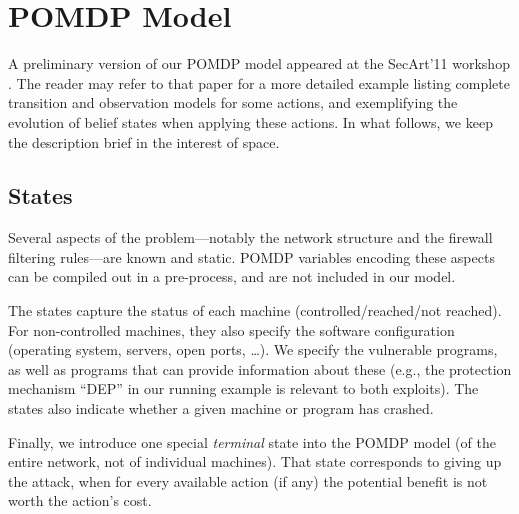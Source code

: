 \section{POMDP Model}
\label{POMDP-model}


A preliminary version of our POMDP model appeared at the SecArt'11
workshop \cite{SarBufHof11}. The reader may refer to that paper for a
more detailed example listing complete transition and observation
models for some actions, and exemplifying the evolution of belief
states when applying these actions. In what follows, we keep the
description brief in the interest of space.





\subsection{States}
\label{POMDP-model:states}


Several aspects of the problem---notably the network structure and the
firewall filtering rules---are known and static. POMDP variables
encoding these aspects can be compiled out in a pre-process, and are
not included in our model.

The states capture the status of each machine (controlled/reached/not
reached). For non-controlled machines, they also specify the software
configuration (operating system, servers, open ports, \dots). We
specify the vulnerable programs, as well as programs that can provide
information about these (e.g., the protection mechanism ``DEP'' in our
running example is relevant to both exploits). The states also
indicate whether a given machine or program has crashed. 

Finally, we introduce one special \emph{terminal} state into the POMDP
model (of the entire network, not of individual machines). That state
corresponds to giving up the attack, when for every available action
(if any) the potential benefit is not worth the action's cost.



